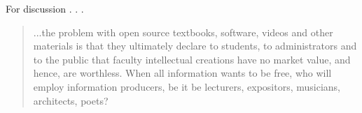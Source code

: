 \begin{frame}



\end{frame}


\begin{frame}{For discussion . . .}

 \begin{quote}
\footnotesize
...the problem with open source textbooks, software, videos and other materials is that they ultimately declare to students, to administrators and to the public that faculty intellectual creations have no market value, and hence, are worthless.  When all information wants to be free, who will employ information producers, be it be lecturers, expositors, musicians, architects, poets?
\end{quote}

\end{frame}


